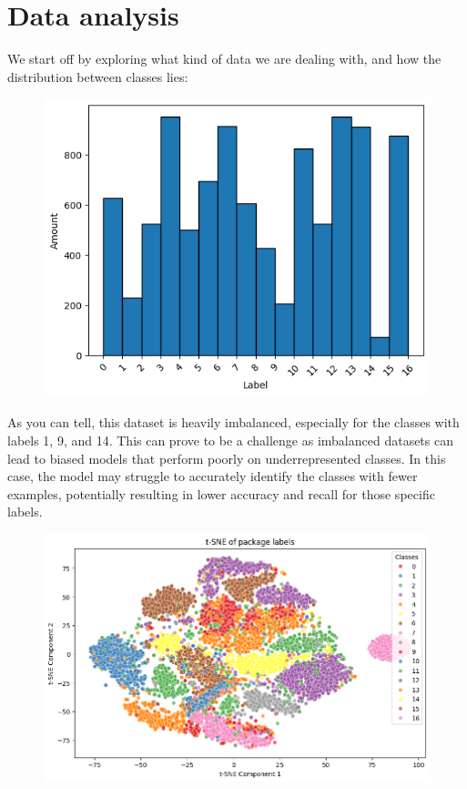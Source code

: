 \documentclass{article}
\begin{document}
\section{Data analysis}

We start off by exploring what kind of data we are dealing with, and how the distribution between classes lies:

\begin{figure}[H]
    \centering
    \includegraphics[width=1\linewidth]{distribution.png}
\end{figure}

As you can tell, this dataset is heavily imbalanced, especially for the classes with labels 1, 9, and 14. This can prove to be a challenge as imbalanced datasets can lead to biased models that perform poorly on underrepresented classes. In this case, the model may struggle to accurately identify the classes with fewer examples, potentially resulting in lower accuracy and recall for those specific labels.

\newpage

\begin{figure}[H]
    \centering
    \includegraphics[width=1\linewidth]{tsne.png}
\end{figure}
\end{document}
